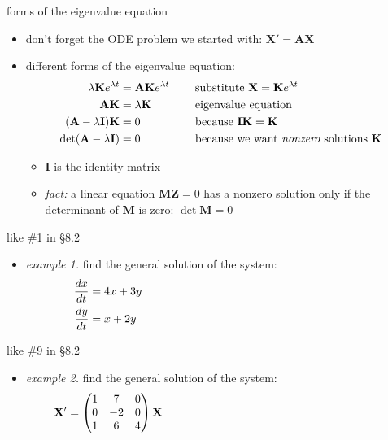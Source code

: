 \documentclass[urlcolor=blue,dvipsnames]{beamer}
\newcommand{\bA}{\mathbf{A}}
\newcommand{\bI}{\mathbf{I}}
\newcommand{\bK}{\mathbf{K}}
\newcommand{\bM}{\mathbf{M}}
\newcommand{\bX}{\mathbf{X}}
\newcommand{\bZ}{\mathbf{Z}}
\begin{document}
\begin{frame}{forms of the eigenvalue equation}

\begin{itemize}
\medskip
\item don't forget the ODE problem we started with: \quad $\bX' = \bA \bX$

\bigskip
\item different forms of the eigenvalue equation:
\begin{align*}
\lambda \bK e^{\lambda t} &= \bA \bK e^{\lambda t} & &\text{substitute $\bX=\bK e^{\lambda t}$} \\
\bA \bK &= \lambda \bK\hspace{10mm} & &\text{eigenvalue equation} \\
(\bA - \lambda \bI)\bK &= 0 & &\text{because $\bI\bK = \bK$} \\
\det(\bA - \lambda \bI) &= 0 & &\text{because we want \emph{nonzero} solutions $\bK$}
\end{align*}

    \begin{itemize}
    \item $\bI$ is the identity matrix
    \item \emph{fact:} a linear equation $\bM \bZ = 0$ has a nonzero solution only if the determinant of $\bM$ is zero: \qquad $\det \bM=0$
    \end{itemize}
\end{itemize}
\end{frame}


\begin{frame}{like \#1 in \S8.2}

\begin{itemize}
\item \emph{example 1.}  find the general solution of the system:
\begin{align*}
\frac{dx}{dt} &= 4x + 3y \hspace{70mm} \\
\frac{dy}{dt} &= x + 2y
\end{align*}
\end{itemize}

\vspace{45mm}
\end{frame}


\begin{frame}{like \#9 in \S8.2}

\begin{itemize}
\item \emph{example 2.}  find the general solution of the system:
$$\bX' = \begin{pmatrix} 1 & 7 & 0 \\ 0 & -2 & 0 \\ 1 & 6 & 4 \end{pmatrix} \bX \hspace{70mm}$$
\end{itemize}

\vspace{50mm}
\end{frame}
\end{document}
